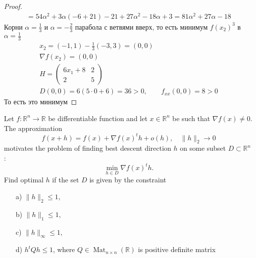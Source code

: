 \begin{proof}
\begin{gather*}
        = 54\alpha^2 + 3\alpha(-6 + 21) - 21 + 27\alpha^2 - 18\alpha + 3
        = 81\alpha^2 + 27\alpha - 18
    \end{gather*}
    Корни $\alpha = \frac{1}{3}$ и $\alpha = -\frac{2}{3}$ парабола с ветвями вверх, то есть минимум $f(x_2)^3$ в $\alpha = \frac{1}{3}$\\
    \begin{gather*}
        x_2 = (-1, 1) - \frac{1}{3}(-3, 3) = (0,0)\\
        \nabla f(x_2) = (0, 0)\\
        H =
        \begin{pmatrix}
            6x_1 + 8 & 2\\
            2 & 5
        \end{pmatrix}\\
        D(0,0) = 6(5 \cdot 0 + 6) = 36 > 0,\qquad f_{xx}(0,0) = 8 > 0
    \end{gather*}
    То есть это минимум
\end{proof}
\vskip 0.4in





\begin{prob}
    Let $f: \mathbb{R}^n \rightarrow \mathbb{R}$ be differentiable function and let $x \in \mathbb{R}^n$ be such that $\nabla f(x) \neq 0$. The approximation
    $$
    f(x+h)=f(x)+\nabla f(x)^t h+o(h), \quad\|h\|_2 \rightarrow 0
    $$
    motivates the problem of finding best descent direction $h$ on some subset $D \subset \mathbb{R}^n$ :
    $$
    \min _{h \in D} \nabla f(x)^t h .
    $$
    Find optimal $h$ if the set $D$ is given by the constraint
    \begin{itemize}
        \item[a)] $\|h\|_2 \leq 1$,
        \item[b)] $\|h\|_1 \leq 1$,
        \item[c)] $\|h\|_{\infty} \leq 1$,
        \item[d)] $h^t Q h \leq 1$, where $Q \in \operatorname{Mat}_{n \times n}(\mathbb{R})$ is positive definite matrix
    \end{itemize}
\end{prob}

